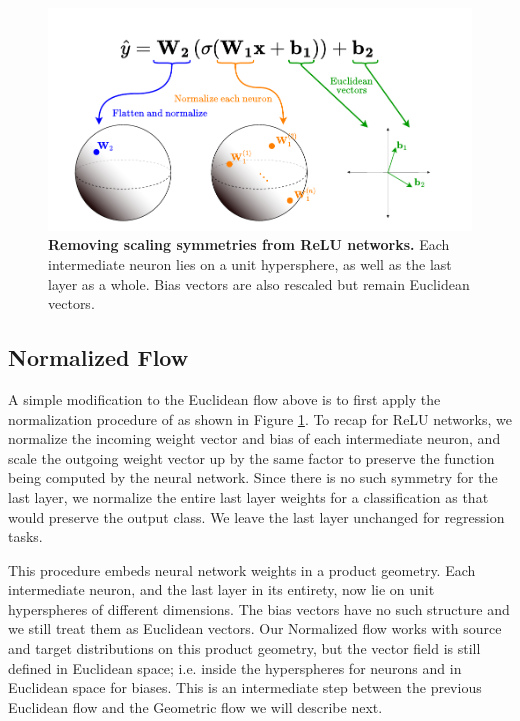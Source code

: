 \begin{figure}[t!]
    \centering
    \includegraphics[width=\textwidth]{figures/canonicalization.drawio.pdf}
    \caption{\label{fig:canonicalization}\textbf{Removing scaling symmetries from ReLU networks.} Each intermediate neuron lies on a unit hypersphere, as well as the last layer as a whole. Bias vectors are also rescaled but remain Euclidean vectors.}
\end{figure}


\subsection{Normalized Flow}

A simple modification to the Euclidean flow above is to first apply the normalization procedure of \citep{pittorinoDeepNetworksToroids2022} as shown in Figure \ref{fig:canonicalization}. To recap for ReLU networks, we normalize the incoming weight vector and bias of each intermediate neuron, and scale the outgoing weight vector up by the same factor to preserve the function being computed by the neural network. Since there is no such symmetry for the last layer, we normalize the entire last layer weights for a classification as that would preserve the output class. We leave the last layer unchanged for regression tasks. 

This procedure embeds neural network weights in a product geometry. Each intermediate neuron, and the last layer in its entirety, now lie on unit hyperspheres of different dimensions. The bias vectors have no such structure and we still treat them as Euclidean vectors. Our Normalized flow works with source and target distributions on this product geometry, but the vector field is still defined in Euclidean space; i.e. inside the hyperspheres for neurons and in Euclidean space for biases. This is an intermediate step between the previous Euclidean flow and the Geometric flow we will describe next. 

